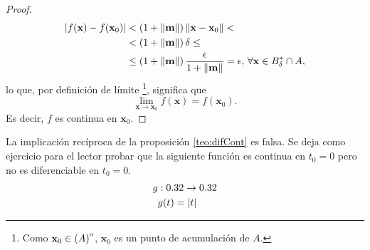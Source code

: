 \begin{proof}
\begin{align*}
 \abs{ f(\mathbf{x}) - f(\mathbf{x}_0) } &< \left( 1 + \norm{\mathbf{m}} \right) \norm{\mathbf{x} - \mathbf{x}_0} < \\
                       &<   \left( 1 + \norm{\mathbf{m}} \right) \delta \le \\
                       &\le \left( 1 + \norm{\mathbf{m}} \right) \frac{\epsilon}{1 + \norm{\mathbf{m}}} = \epsilon, 
                       \, \forall \mathbf{x} \in B^*_{\delta} \cap A,
\end{align*}
lo que, por definici\'on de l\'imite \footnote{Como $\mathbf{x}_0 \in {\kern0pt(A)}^{\mathrm{o}}$, $\mathbf{x}_0$ es un punto de acumulaci\'on de $A$. }, significa que 
\[
 \lim_{\mathbf{x} \to \mathbf{x}_0}f(\mathbf{x}) = f(\mathbf{x}_0).
\]
Es decir, $f$ es continua en $\mathbf{x}_0$.
\end{proof}




\begin{obs} La implicaci\'on rec\'iproca de la proposici\'on \eqref{teo:difCont} es falsa.  Se deja como ejercicio para el lector probar que la siguiente funci\'on es continua en $t_0 = 0$ pero no es diferenciable en $t_0 = 0$.
  \begin{align*}
      g & :0.32 \to 0.32 \\
        & g(t) = \abs{t}
 \end{align*}
\end{obs}










